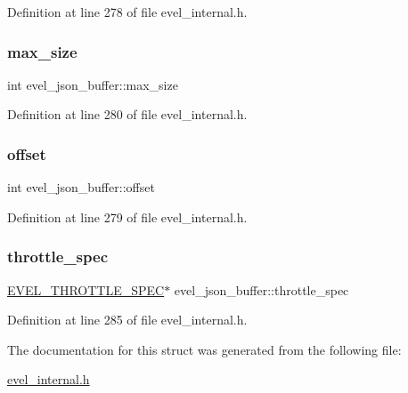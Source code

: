 Definition at line 278 of file evel\+\_\+internal.\+h.

\hypertarget{structevel__json__buffer_ad13f44105bee4bbf2a3c46d92f777ac8}{}\label{structevel__json__buffer_ad13f44105bee4bbf2a3c46d92f777ac8} 
\subsubsection{\texorpdfstring{max\+\_\+size}{max\_size}}
{\footnotesize\ttfamily int evel\+\_\+json\+\_\+buffer\+::max\+\_\+size}



Definition at line 280 of file evel\+\_\+internal.\+h.

\hypertarget{structevel__json__buffer_a30a33971848b5da3466e58f3a15a5d23}{}\label{structevel__json__buffer_a30a33971848b5da3466e58f3a15a5d23} 
\subsubsection{\texorpdfstring{offset}{offset}}
{\footnotesize\ttfamily int evel\+\_\+json\+\_\+buffer\+::offset}



Definition at line 279 of file evel\+\_\+internal.\+h.

\hypertarget{structevel__json__buffer_a5e95f365ab2e96efafa55584491267f3}{}\label{structevel__json__buffer_a5e95f365ab2e96efafa55584491267f3} 
\subsubsection{\texorpdfstring{throttle\+\_\+spec}{throttle\_spec}}
{\footnotesize\ttfamily \hyperlink{evel__internal_8h_a50932473d7d2e8f802d39b4f73e5b64f}{E\+V\+E\+L\+\_\+\+T\+H\+R\+O\+T\+T\+L\+E\+\_\+\+S\+P\+EC}$\ast$ evel\+\_\+json\+\_\+buffer\+::throttle\+\_\+spec}



Definition at line 285 of file evel\+\_\+internal.\+h.



The documentation for this struct was generated from the following file\+:\begin{DoxyCompactItemize}
\item 
\hyperlink{evel__internal_8h}{evel\+\_\+internal.\+h}\end{DoxyCompactItemize}
